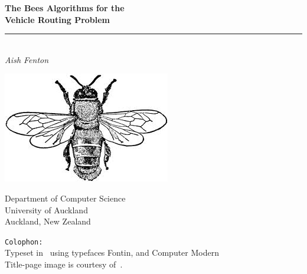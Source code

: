 

\begin{titlepage}


\vspace*{6em}

\begin{center}
   \LARGE\textbf{The Bees Algorithms for the\\ Vehicle Routing Problem\\}
   \rule{224pt}{0.75pt}\\
   \vspace*{0.75em}
   \rmfamily\large\textit{Aish Fenton}
\end{center}

\hspace{70pt}\includegraphics[scale=0.15, angle=315]{images/bee.jpeg}

\vfill
\small\rmfamily
\begin{flushright}
Department of Computer Science\\
University of Auckland \\
Auckland, New Zealand 
\end{flushright}

\end{titlepage}

\thispagestyle{empty}
\texttt{Colophon:}\\
Typeset in \XeTeX\ using typefaces  Fontin, \rmfamily and Computer Modern \\
Title-page image is courtesy of~\cite{beeimage}.
